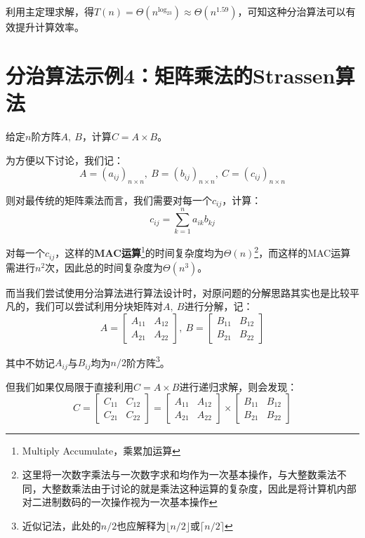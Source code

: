 \documentclass[12pt,a4paper,violet,oneside]{bbe}
\begin{document}
利用主定理求解，得$T(n)=\Theta(n^{\log_23})\approx\Theta(n^{1.59})$，可知这种分治算法可以有效提升计算效率。
\section{分治算法示例4：矩阵乘法的Strassen算法}
\begin{example}
	给定$n$阶方阵$A,~B$，计算$C=A\times B$。
\end{example}

为方便以下讨论，我们记：
$$
A=(a_{ij})_{n\times n},~B=(b_{ij})_{n\times n},~C=(c_{ij})_{n\times n}
$$

则对最传统的矩阵乘法而言，我们需要对每一个$c_{ij}$，计算：
$$
c_{ij}=\sum\limits_{k=1}^{n}a_{ik}b_{kj}
$$

对每一个$c_{ij}$，这样的\textbf{MAC运算}\footnote{Multiply Accumulate，乘累加运算}的时间复杂度均为$\Theta(n)$\footnote{这里将一次数字乘法与一次数字求和均作为一次基本操作，与大整数乘法不同，大整数乘法由于讨论的就是乘法这种运算的复杂度，因此是将计算机内部对二进制数码的一次操作视为一次基本操作}，而这样的MAC运算需进行$n^2$次，因此总的时间复杂度为$\Theta(n^3)$。

而当我们尝试使用分治算法进行算法设计时，对原问题的分解思路其实也是比较平凡的，我们可以尝试利用分块矩阵对$A,~B$进行分解，记：
$$
A=\left[\begin{array}{cc}
	A_{11}&A_{12}\\
	A_{21}&A_{22}
\end{array}\right],~B=\left[\begin{array}{cc}
B_{11}&B_{12}\\
B_{21}&B_{22}
\end{array}\right]
$$

其中不妨记$A_{ij}$与$B_{ij}$均为$n/2$阶方阵\footnote{近似记法，此处的$n/2$也应解释为$\lfloor n/2\rfloor$或$\lceil n/2\rceil$}。

但我们如果仅局限于直接利用$C=A\times B$进行递归求解，则会发现：
$$
C=\left[\begin{array}{cc}
	C_{11}&C_{12}\\
	C_{21}&C_{22}
\end{array}\right]=\left[\begin{array}{cc}
	A_{11}&A_{12}\\
	A_{21}&A_{22}
\end{array}\right]\times\left[\begin{array}{cc}
	B_{11}&B_{12}\\
	B_{21}&B_{22}
\end{array}\right]
$$
\end{document}
